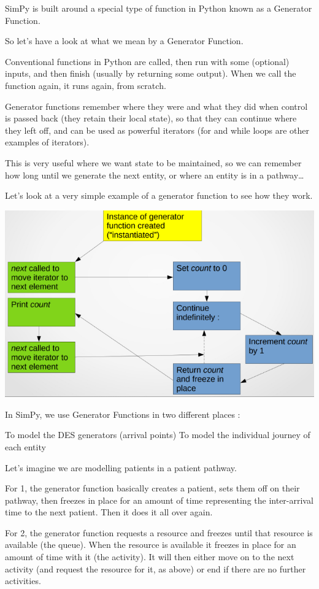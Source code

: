 \documentclass[
  letterpaper,
  DIV=11,
  numbers=noendperiod]{scrreprt}
\begin{document}
SimPy is built around a special type of function in Python known as a
Generator Function.

So let's have a look at what we mean by a Generator Function.

Conventional functions in Python are called, then run with some
(optional) inputs, and then finish (usually by returning some output).
When we call the function again, it runs again, from scratch.

Generator functions remember where they were and what they did when
control is passed back (they retain their local state), so that they can
continue where they left off, and can be used as powerful iterators (for
and while loops are other examples of iterators).

This is very useful where we want state to be maintained, so we can
remember how long until we generate the next entity, or where an entity
is in a pathway\ldots{}

Let's look at a very simple example of a generator function to see how
they work.

\includegraphics{images/generator_func_example.png}

In SimPy, we use Generator Functions in two different places :

To model the DES generators (arrival points) To model the individual
journey of each entity

Let's imagine we are modelling patients in a patient pathway.

For 1, the generator function basically creates a patient, sets them off
on their pathway, then freezes in place for an amount of time
representing the inter-arrival time to the next patient. Then it does it
all over again.

For 2, the generator function requests a resource and freezes until that
resource is available (the queue). When the resource is available it
freezes in place for an amount of time with it (the activity). It will
then either move on to the next activity (and request the resource for
it, as above) or end if there are no further activities.
\end{document}
